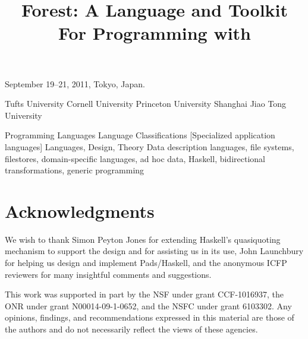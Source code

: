 \documentclass[natbib]{sigplanconf}
\newif\iftr\trfalse              %
\newif\ifappendix\appendixfalse   %
\begin{document}


 {September 19--21, 2011, Tokyo, Japan.}

\title{Forest\iftr{} 1.0\fi: A Language and Toolkit For Programming with \Filestores{}}

	   {Tufts University}{}
           {Cornell University}{}
           {Princeton University}{}
           {Shanghai Jiao Tong University}{}

\maketitle{}

\begin{abstract}  

\end{abstract}

  {Programming Languages}
  {Language Classifications}
  [Specialized application languages]
\terms
Languages, Design, Theory
\keywords
Data description languages, 
file systems, 
filestores,
domain-specific languages, 
ad hoc data, 
Haskell, 
bidirectional transformations,
generic programming











\section*{Acknowledgments}

We wish to thank Simon Peyton Jones for extending Haskell's
quasiquoting mechanism to support the \forest{} design and for
assisting us in its use, John Launchbury for helping us design and
implement Pads/Haskell, and the anonymous ICFP reviewers for many
insightful comments and suggestions. 

This work was supported in part by the NSF under grant CCF-1016937,
the ONR under grant N00014-09-1-0652, and the NSFC under grant
6103302. Any opinions, findings, and recommendations expressed in this
material are those of the authors and do not necessarily reflect the
views of these agencies.


\balance


\ifappendix
\newpage
\appendix
\onecolumn

\closeproofchan
\section{Proofs}

\noindent This appendix contains the proofs of the theorems stated in
Section~\ref{sec:theory}.

\label{sec:proof-appendix}


\newpage

\fi
\end{document}
